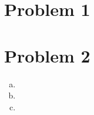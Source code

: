 \documentclass[letterpaper]{article}
\newcommand{\slisbls}{\setlength{\itemsep}{\baselineskip}}
\begin{document}
\section*{Problem 1}
\newpage
\section*{Problem 2}
\begin{enumerate}[(a)]\slisbls
\item %
\item %
\item %
\end{enumerate}
\end{document}
